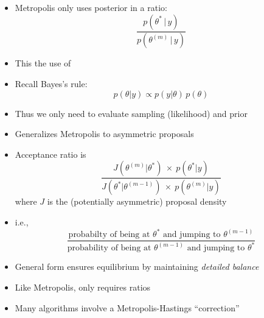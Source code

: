 \documentclass[10pt]{report}
\begin{document}
\begin{itemize}\small
\item Metropolis only uses posterior in a ratio:
\[
\frac{p(\theta^{*} \, | \, y)}
     {p(\theta^{(m)} \, | \, y)}
\]
\item This  the use of 
\item Recall Bayes's rule:
\[
p(\theta | y) \propto p(y|\theta) \, p(\theta)
\]
\item Thus we only need to evaluate sampling (likelihood) and prior
\end{itemize}

\begin{itemize}
\item Generalizes Metropolis to asymmetric proposals
\item Acceptance ratio is
\[
\frac{J(\theta^{(m)}|\theta^{*}) \ \times \ p(\theta^{*}|y)}
     {J(\theta^{*}|\theta^{(m-1)}) \ \times \ p(\theta^{(m)}|y)}
\]
where $J$ is the (potentially asymmetric) proposal density
\item i.e., 
{\small
\[
\frac{\mbox{probabilty of being at } \theta^*
      \mbox{ and jumping to } \theta^{(m-1)}}
     {\mbox{probability of being at } \theta^{(m-1)}
      \mbox{ and jumping to } \theta^{*}}
\]
}
\end{itemize}

\begin{itemize}
\item General form ensures equilibrium 
  by maintaining \emph{detailed balance}
\item Like Metropolis, only requires ratios
\item Many algorithms involve a Metropolis-Hastings ``correction''
\end{itemize}
\end{document}
